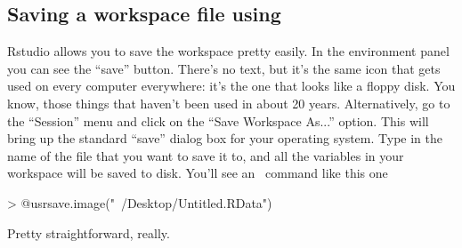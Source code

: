 \subsection{Saving a workspace file using \Rstudio\label{sec:save1}}

Rstudio allows you to save the workspace pretty easily. In the environment panel you can see the ``save'' button. There's no text, but it's the same icon that gets used on every computer everywhere: it's the one that looks like a floppy disk. You know, those things that haven't been used in about 20 years. Alternatively, go to the ``Session'' menu and click on the ``Save Workspace As...'' option. This will bring up the standard ``save'' dialog box for your operating system. Type in the name of the file that you want to save it to, and all the variables in your workspace will be saved to disk. You'll see an \R\ command like this one
\begin{rblock1}
> @usr{save.image("~/Desktop/Untitled.RData")}
\end{rblock1}
Pretty straightforward, really.



